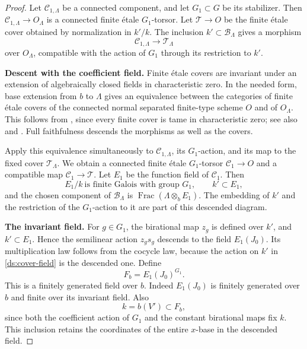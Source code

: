 \begin{proof}
Let $\mathcal C_{1,\Lambda}$ be a connected component, and let
$G_1\subset G$ be its stabilizer.  Then
$\mathcal C_{1,\Lambda}\to O_\Lambda$ is a connected finite
\'etale $G_1$-torsor.  Let $\mathcal T\to O$ be the finite
\'etale cover obtained by normalization in $k'/k$.  The inclusion
$k'\subset\mathcal B_\Lambda$ gives a morphism
\[
 \mathcal C_{1,\Lambda}\longrightarrow\mathcal T_\Lambda
\]
over $O_\Lambda$, compatible with the action of $G_1$ through its
restriction to $k'$.

\smallskip\noindent\textbf{Descent with the coefficient field.}\enspace
Finite \'etale covers are invariant under an extension of
algebraically closed fields in characteristic zero.  In the
needed form, base extension from $b$ to $\Lambda$ gives an
equivalence between the categories of finite \'etale covers of
the connected normal separated finite-type scheme $O$ and of
$O_\Lambda$.  This follows from
\cite[Theorem~1.1]{Landesman24}, since every finite cover is tame in
characteristic zero; see also \cite[Remark~1.5]{Landesman24} and
\cite[Expos\'e~XIII, Proposition~4.6]{SGA1}.  Full faithfulness
descends the morphisms as well as the covers.

Apply this equivalence simultaneously to
$\mathcal C_{1,\Lambda}$, its $G_1$-action, and its map to the
fixed cover $\mathcal T_\Lambda$.  We obtain a connected finite
\'etale $G_1$-torsor $\mathcal C_1\to O$ and a compatible map
$\mathcal C_1\to\mathcal T$.  Let $E_1$ be the function field of
$\mathcal C_1$.  Then
\begin{equation}
 E_1/k\ \text{is finite Galois with group }G_1,
 \qquad k'\subset E_1,
 \label{ds:cover-field}
\end{equation}
and the chosen component of $\mathcal B_\Lambda$ is
$\operatorname{Frac}(\Lambda\otimes_bE_1)$.
The embedding of $k'$ and the restriction of the $G_1$-action to
it are part of this descended diagram.

\smallskip\noindent\textbf{The invariant field.}\enspace
For $g\in G_1$, the birational map $z_g$ is defined over $k'$,
and $k'\subset E_1$.  Hence the semilinear action
$z_gs_g$ descends to the field $E_1(J_0)$.  Its multiplication
law follows from the cocycle law, because the action on $k'$ in
\eqref{ds:cover-field} is the descended one.  Define
\begin{equation}
 F_b=E_1(J_0)^{G_1}.
 \label{ds:descended-field}
\end{equation}
This is a finitely generated field over $b$.  Indeed
$E_1(J_0)$ is finitely generated over $b$ and finite over its
invariant field.  Also
\begin{equation}
 k=b(V')\subset F_b,
 \label{ds:retained-coordinates}
\end{equation}
since both the coefficient action of $G_1$ and the constant
birational maps fix $k$.  This inclusion retains the coordinates
of the entire $x$-base in the descended field.


\end{proof}
